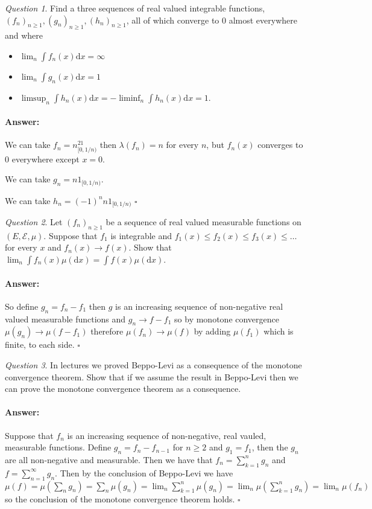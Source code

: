 \documentclass[11pt]{article}
\theoremstyle{definition}
\theoremstyle{remark}
\newtheorem{q}{Question}
\newenvironment{ans}{\paragraph{Answer:}}{\hfill$\square$ \vspace{10pt}}
\begin{document}
\begin{q}
Find a three sequences of real valued integrable functions, $(f_n)_{n\geq 1}, (g_n)_{n \geq 1}, (h_n)_{n \geq 1}$, all of which converge to 0 almost everywhere and where 
\begin{itemize}
\item $\lim_n \int f_n(x) \mathrm{d}x = \infty$
\item $\lim_n \int g_n(x) \mathrm{d}x = 1$
\item $\limsup_n \int h_n(x) \mathrm{d}x = - \liminf_n \int h_n(x) \mathrm{d}x = 1$.
\end{itemize}
\end{q}
\begin{ans}
We can take $f_n = n^21_{[0,1/n)}$ then $\lambda(f_n) = n$ for every $n$, but $f_n(x)$ converges to 0 everywhere except $x=0$.

We can take $g_n = n1_{[0,1/n)}$.

We can take $h_n = (-1)^n n1_{[0,1/n)}$
\end{ans}

\begin{q}
Let $(f_n)_{n \geq 1}$ be a sequence of real valued measurable functions on $(E, \mathcal{E}, \mu)$. Suppose that $f_1$ is integrable and $f_1(x) \leq f_2(x) \leq f_3(x) \leq \dots$ for every $x$ and $f_n(x) \rightarrow f(x)$. Show that $\lim_n \int f_n(x) \mu(\mathrm{d}x) = \int f(x) \mu(\mathrm{d}x)$.
\end{q}
\begin{ans}
So define $g_n = f_n -f_1$ then $g$ is an increasing sequence of non-negative real valued measurable functions and $g_n \rightarrow f-f_1$ so by monotone convergence $\mu(g_n) \rightarrow \mu(f-f_1)$ therefore $\mu(f_n) \rightarrow \mu(f)$ by adding $\mu(f_1)$ which is finite, to each side.
\end{ans}

\begin{q}
In lectures we proved Beppo-Levi as a consequence of the monotone convergence theorem. Show that if we assume the result in Beppo-Levi then we can prove the monotone convergence theorem as a consequence. 
\end{q}

\begin{ans}
Suppose that $f_n$ is an increasing sequence of non-negative, real vauled, measurable functions. Define $g_n = f_n-f_{n-1}$ for $n \geq 2$ and $g_1 = f_1$, then the $g_n$ are all non-negative and measurable. Then we have that $f_n = \sum_{k=1}^n g_n$ and $f = \sum_{n=1}^\infty g_n$. Then by the conclusion of Beppo-Levi we have $\mu(f) = \mu(\sum_n g_n) = \sum_n \mu(g_n) = \lim_n \sum_{k=1}^n \mu(g_n) = \lim_n \mu( \sum_{k=1}^n g_n) = \lim_n \mu(f_n)$ so the conclusion of the monotone convergence theorem holds.
\end{ans}
\end{document}
